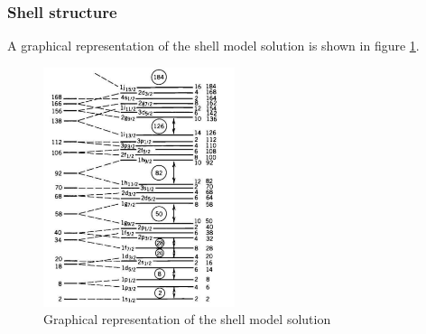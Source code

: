 \subsubsection{Shell structure}
A graphical representation of the shell model solution is shown in figure \ref{fig:shell_model}. 
\begin{figure}[h]
    \centering
    \includegraphics[width=0.5\textwidth]{Images/ShellModel.png}
    \caption{Graphical representation of the shell model solution}
    \label{fig:shell_model}
\end{figure}


